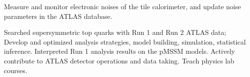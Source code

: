 \begin{cventries}
\end{cventries}
    \vspace{-1cm}
    \parbox{0.8\linewidth}{
      \leftskip=0.5in
        Measure and monitor electronic noises of the tile calorimeter, and update noise parameters in the  ATLAS database.
    }
\begin{cventries}
\end{cventries}
    \vspace{-1cm}
     \parbox{0.8\linewidth}{
      \leftskip=0.5in
        Searched supersymmetric top quarks with Run 1 and Run 2 ATLAS data; Develop and optimized analysis strategies, model building, simulation, statistical inference. \newline 
        Interpreted Run 1 analysis results on the pMSSM models. \newline
        Actively contribute to ATLAS detector operations and data taking. \newline
        Teach physics lab courses.
      }
